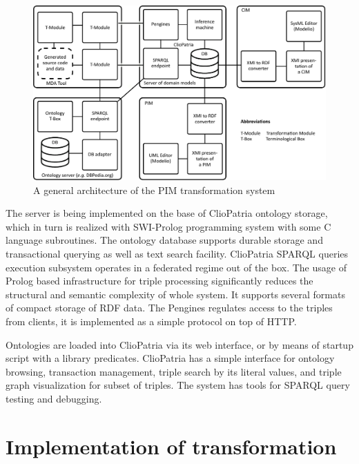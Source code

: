 \documentclass[runningheads]{llncs}
\begin{document}
\begin{figure}[t]
  \centering
  \includegraphics[width=1\linewidth]{architecture-mda-lod-ext.pdf}
  \caption{A general architecture of the PIM transformation system}
  \label{fig:arch}
\end{figure}

The server is being implemented on the base of ClioPatria ontology storage, which in turn is realized with SWI-Prolog programming system with some C language subroutines.  The ontology database supports durable storage and transactional querying as well as text search facility.  ClioPatria SPARQL queries execution subsystem operates in a federated regime out of the box.  The usage of Prolog based infrastructure for triple processing significantly reduces the structural and semantic complexity of whole system. It supports several formats of compact storage of RDF data.  The Pengines regulates access to the triples from clients, it is implemented as a simple protocol on top of HTTP.  %

Ontologies are loaded into ClioPatria via its web interface, or by means of startup script with a library predicates.  ClioPatria has a simple interface for ontology browsing, transaction management, triple search by its literal values, and triple graph visualization for subset of triples.  The system has tools for SPARQL query testing and debugging.

\section{Implementation of transformation}
\label{sec:impl}
\end{document}
